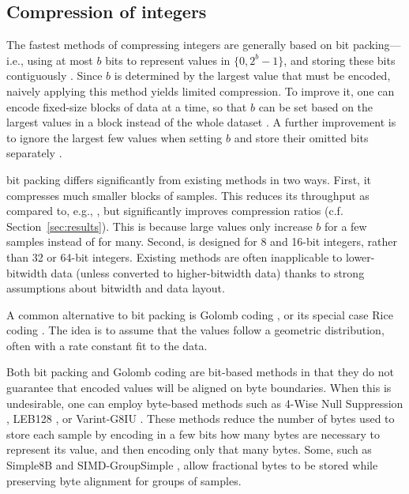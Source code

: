 \subsection{Compression of integers}


The fastest methods of compressing integers are generally based on bit packing---i.e., using at most $b$ bits to represent values in $\{0, 2^b-1\}$, and storing these bits contiguously \cite{bbp, pfor, fastpfor}. Since $b$ is determined by the largest value that must be encoded, naively applying this method yields limited compression. To improve it, one can encode fixed-size blocks of data at a time, so that $b$ can be set based on the largest values in a block instead of the whole dataset \cite{kGamma, pfor, fastpfor}. A further improvement is to ignore the largest few values when setting $b$ and store their omitted bits separately \cite{pfor, fastpfor}.

\minesp bit packing differs significantly from existing methods in two ways. First, it compresses much smaller blocks of samples. This reduces its throughput as compared to, e.g., \cite{fastpfor}, but significantly improves compression ratios (c.f. Section~\ref{sec:results}). This is because large values only increase $b$ for a few samples instead of for many. Second, \minesp is designed for 8 and 16-bit integers, rather than 32 or 64-bit integers. Existing methods are often inapplicable to lower-bitwidth data (unless converted to higher-bitwidth data) thanks to strong assumptions about bitwidth and data layout.

A common \cite{flac, shorten} alternative to bit packing is Golomb coding \cite{golomb}, or its special case Rice coding \cite{rice}. The idea is to assume that the values follow a geometric distribution, often with a rate constant fit to the data. %

Both bit packing and Golomb coding are bit-based methods in that they do not guarantee that encoded values will be aligned on byte boundaries. When this is undesirable, one can employ byte-based methods such as 4-Wise Null Suppression \cite{kGamma}, LEB128 \cite{dwarf}, or Varint-G8IU \cite{varintG8IU}. These methods reduce the number of bytes used to store each sample by encoding in a few bits how many bytes are necessary to represent its value, and then encoding only that many bytes. Some, such as Simple8B \cite{simple8b} and SIMD-GroupSimple \cite{groupSimd}, allow fractional bytes to be stored while preserving byte alignment for groups of samples. %

